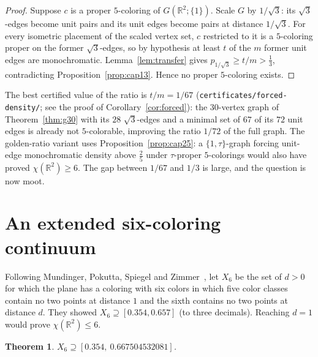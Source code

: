 \documentclass[11pt]{article}
\newtheorem{theorem}{Theorem}[section]
\theoremstyle{definition}
\theoremstyle{remark}
\newcommand{\R}{\mathbb{R}}
\begin{document}
\begin{proof}
Suppose $c$ is a proper $5$-coloring of $G(\R^2;\{1\})$.  Scale $G$ by
$1/\sqrt3$: its $\sqrt3$-edges become unit pairs and its unit edges
become pairs at distance $1/\sqrt3$.  For every isometric placement of
the scaled vertex set, $c$ restricted to it is a $5$-coloring proper on
the former $\sqrt3$-edges, so by hypothesis at least $t$ of the $m$
former unit edges are monochromatic.  Lemma~\ref{lem:transfer} gives
$p_{1/\sqrt3}\ge t/m>\tfrac13$, contradicting
Proposition~\ref{prop:cap13}.  Hence no proper $5$-coloring exists.
\end{proof}

The best certified value of the ratio is $t/m=1/67$
(\texttt{certificates/forced-density/}; see the proof of
Corollary~\ref{cor:forced}): the $30$-vertex graph of
Theorem~\ref{thm:g30} with its $28$ $\sqrt3$-edges and a minimal set of
$67$ of its $72$ unit edges is already not $5$-colorable, improving the
ratio $1/72$ of the full graph.  The golden-ratio variant uses
Proposition~\ref{prop:cap25}: a $\{1,\tau\}$-graph forcing unit-edge
monochromatic density above $\tfrac25$ under $\tau$-proper
$5$-colorings would also have proved $\chi(\R^2)\ge6$.  The gap between
$1/67$ and $1/3$ is large, and the question is now moot.

\section{An extended six-coloring continuum}\label{sec:continuum}

Following Mundinger, Pokutta, Spiegel and Zimmer~\cite{MPSZ}, let $X_6$ be the set of $d>0$ for which the plane has a coloring with six colors in which five color classes contain no two points at distance $1$ and the sixth contains no two points at distance $d$. They showed $X_6\supseteq[0.354,0.657]$ (to three decimals). Reaching $d=1$ would prove $\chi(\R^2)\le6$.

\begin{theorem}\label{thm:continuum}
$X_6\supseteq[0.354,\ 0.667504532081]$.
\end{theorem}
\end{document}
